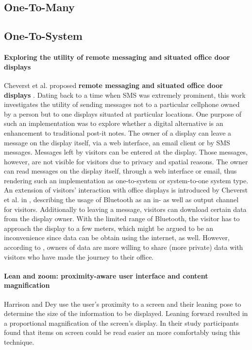 \subsection{One-To-Many}

\subsection{One-To-System}

\paragraph{Exploring the utility of remote messaging and situated office door displays}
Cheverst et al. proposed \textbf{remote messaging and situated office door displays} \cite{cheverst2003exploring}.
Dating back to a time when SMS was extremely prominent, this work investigates the utility of sending messages not to a particular cellphone owned by a person but to one displays situated at particular locations.
One purpose of such an implementation was to explore whether a digital alternative is an enhancement to traditional post-it notes.
The owner of a display can leave a message on the display itself, via a web interface, an email client or by SMS messages.
Messages left by visitors can be entered at the display.
Those messages, however, are not visible for visitors due to privacy and spatial reasons.
The owner can read messages on the display itself, through a web interface or email, thus rendering such an implementation as one-to-system or system-to-one system type.
An extension of visitors’ interaction with office displays is introduced by Cheverst et al. in \cite{cheverst2005exploring}, describing the usage of Bluetooth as an in- as well as output channel for visitors.
Additionally to leaving a message, visitors can download certain data from the display owner.
With the limited range of Bluetooth, the visitor has to approach the display to a few meters, which might be argued to be an inconvenience since data can be obtain using the internet, as well.
However, according to \cite{cheverst2005exploring}, owners of data are more willing to share (more private) data with visitors who have made the journey to their office.

\paragraph{Lean and zoom: proximity-aware user interface and content magnification}
Harrison and Dey \cite{harrison_lean_2008} use the user's proximity to a screen and their leaning pose to determine the size of the information to be displayed.
Leaning forward resulted in a proportional magnification of the screen's display.
In their study participants found that items on screen could be read easier an more comfortably using this technique.

